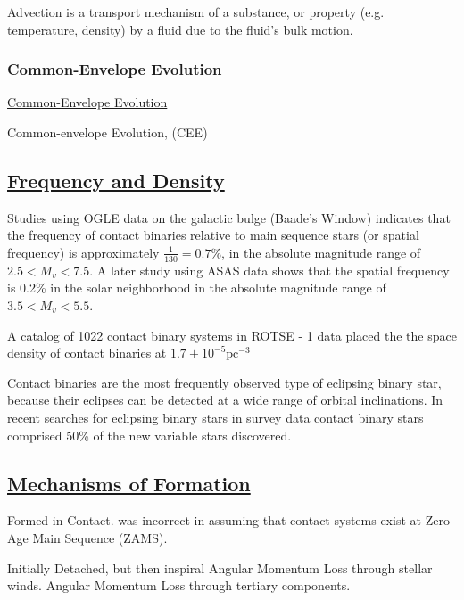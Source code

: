 \documentclass[12pt]{article} %
\numberwithin{equation}{section} %
\begin{document}
Advection is a transport mechanism of a substance, or property (e.g. temperature, density) by a fluid due to the fluid's bulk motion.


\subsubsection{Common-Envelope Evolution}{\hyperlink{toc}{Common-Envelope Evolution}} \label{sec: Common-Envelope Evolution}

Common-envelope Evolution, (CEE) \citep{ivanova2013common}

\subsection[Frequency and Density]{\hyperlink{toc}{Frequency and Density}}

 \citep{rucinski1998contact} Studies using OGLE data on the galactic bulge (Baade's Window) indicates that the frequency of contact binaries relative to main sequence stars (or spatial frequency) is approximately $\frac{1}{130} = 0.7\%$, in the absolute magnitude range of $2.5 < M_{v} < 7.5$. A later study using ASAS data shows that the spatial frequency is 0.2\% in the solar neighborhood \citep{rucinski2006luminosity} in the absolute magnitude range of $3.5 < M_{v} < 5.5$.

A catalog of 1022 contact binary systems in ROTSE - 1 data placed the the space density of contact binaries at $1.7 \pm 10^{-5} \text{pc}^{-3}$
 
Contact binaries are the most frequently observed type of eclipsing binary star, because their eclipses can be detected at a wide range of orbital inclinations. In recent searches for eclipsing binary stars in survey data \citep{drake2014catalina} contact binary stars comprised 50\% of the new variable stars discovered. 

\subsection[Mechanisms of Formation]{\hyperlink{toc}{Mechanisms of Formation}}

Formed in Contact. \citet{lucy1968structure} was incorrect in assuming that contact systems exist at Zero Age Main Sequence (ZAMS).

\citep{yildiz2013origin}

\citep{li2007formation}

Initially Detached, but then inspiral
Angular Momentum Loss through stellar winds. 
Angular Momentum Loss through tertiary components.  \citep{lohr2015orbital}
\end{document}
